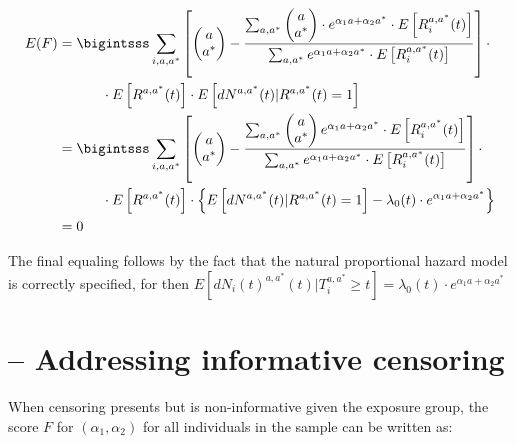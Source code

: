 \documentclass[AMA,STIX1COL]{WileyNJD-v2}
\begin{document}
\begingroup
\fontsize{10pt}{10pt}\selectfont
\begin{align*}
E(F) &=\bigintsss \sum_{i, a, a^*} \left[ \begin{pmatrix} a \\ a^* \end{pmatrix} - \frac{\sum_{a,a^*}\begin{pmatrix} a \\ a^* \end{pmatrix}\cdot e^{\alpha_1a + \alpha_2a^*}\cdot E\left[R^{a,a^*}_i(t)\right]} {\sum_{a,a^*}e^{\alpha_1a + \alpha_2a^*}\cdot E\left[R^{a,a^*}_i(t)\right]}\right]\cdot \\
&\,\,\,\,\,\,\,\,\,\,\,\,\,\,\,\,\,\,\, \cdot  E\left[R^{a,a^*}(t)\right]\cdot  E\left[dN^{a,a^*}(t)|R^{a,a^*}(t)=1\right]\\
&=\bigintsss \sum_{i, a, a^*} \left[ \begin{pmatrix} a \\ a^* \end{pmatrix} - \frac{\sum_{a,a^*}\begin{pmatrix} a \\ a^* \end{pmatrix}e^{\alpha_1a + \alpha_2a^*}\cdot E\left[R^{a,a^*}_i(t)\right]} {\sum_{a,a^*}e^{\alpha_1a + \alpha_2a^*}\cdot E\left[R^{a,a^*}_i(t)\right]}\right]\cdot \\
&\,\,\,\,\,\,\,\,\,\,\,\,\,\,\,\,\,\,\, \cdot E\left[R^{a,a^*}(t)\right]\cdot \left\{ E\left[dN^{a,a^*}(t)|R^{a,a^*}(t)=1\right] - \lambda_0(t)\cdot e^{\alpha_1a+\alpha_2a^*}\right\}\\
&=0
\end{align*}
\endgroup

The final equaling follows by the fact that the natural proportional hazard model is correctly specified, for then $E[dN_i(t)^{a, a^*} (t)|T_i^{a, a^*} \ge t] = \lambda_0(t)\cdot e^{\alpha_1a+\alpha_2a^*}$
\section{-- Addressing informative censoring} 
When censoring presents but is non-informative given the exposure group, the score $F$ for $(\alpha_1, \alpha_2)$ for all individuals in the sample can be written as:
\end{document}
